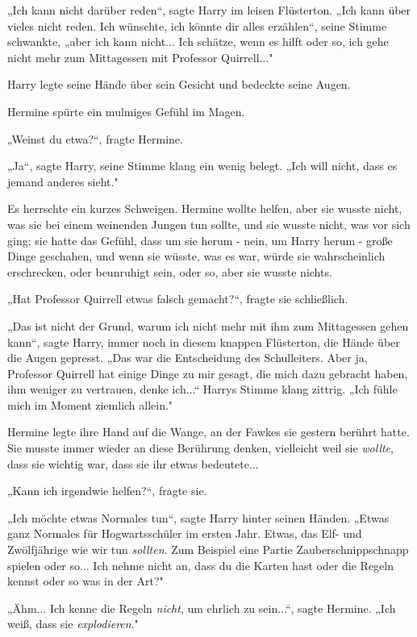 {„Ich kann nicht darüber reden“, sagte Harry im leisen Flüsterton. „Ich kann über vieles nicht reden. Ich wünschte, ich könnte dir alles erzählen“, seine Stimme schwankte, „aber ich kann nicht... Ich schätze, wenn es hilft oder so, ich gehe nicht mehr zum Mittagessen mit Professor Quirrell..."

Harry legte seine Hände über sein Gesicht und bedeckte seine Augen.

Hermine spürte ein mulmiges Gefühl im Magen.

„Weinst du etwa?“, fragte Hermine.

„Ja“, sagte Harry, seine Stimme klang ein wenig belegt. „Ich will nicht, dass es jemand anderes sieht."

Es herrschte ein kurzes Schweigen. Hermine wollte helfen, aber sie wusste nicht, was sie bei einem weinenden Jungen tun sollte, und sie wusste nicht, was vor sich ging; sie hatte das Gefühl, dass um sie herum - nein, um Harry herum - große Dinge geschahen, und wenn sie wüsste, was es war, würde sie wahrscheinlich erschrecken, oder beunruhigt sein, oder so, aber sie wusste nichts.

„Hat Professor Quirrell etwas falsch gemacht?“, fragte sie schließlich.

„Das ist nicht der Grund, warum ich nicht mehr mit ihm zum Mittagessen gehen kann“, sagte Harry, immer noch in diesem knappen Flüsterton, die Hände über die Augen gepresst. „Das war die Entscheidung des Schulleiters. Aber ja, Professor Quirrell hat einige Dinge zu mir gesagt, die mich dazu gebracht haben, ihm weniger zu vertrauen, denke ich...“ Harrys Stimme klang zittrig. „Ich fühle mich im Moment ziemlich allein."

Hermine legte ihre Hand auf die Wange, an der Fawkes sie gestern berührt hatte. Sie musste immer wieder an diese Berührung denken, vielleicht weil sie \emph{wollte}, dass sie wichtig war, dass sie ihr etwas bedeutete...

„Kann ich irgendwie helfen?“, fragte sie.

„Ich möchte etwas Normales tun“, sagte Harry hinter seinen Händen. „Etwas ganz Normales für Hogwartsschüler im ersten Jahr. Etwas, das Elf- und Zwölfjährige wie wir tun \emph{sollten}. Zum Beispiel eine Partie Zauberschnippschnapp spielen oder so... Ich nehme nicht an, dass du die Karten hast oder die Regeln kennst oder so was in der Art?"

„Ähm... Ich kenne die Regeln \emph{nicht}, um ehrlich zu sein...“, sagte Hermine. „Ich weiß, dass sie \emph{explodieren}."

}
